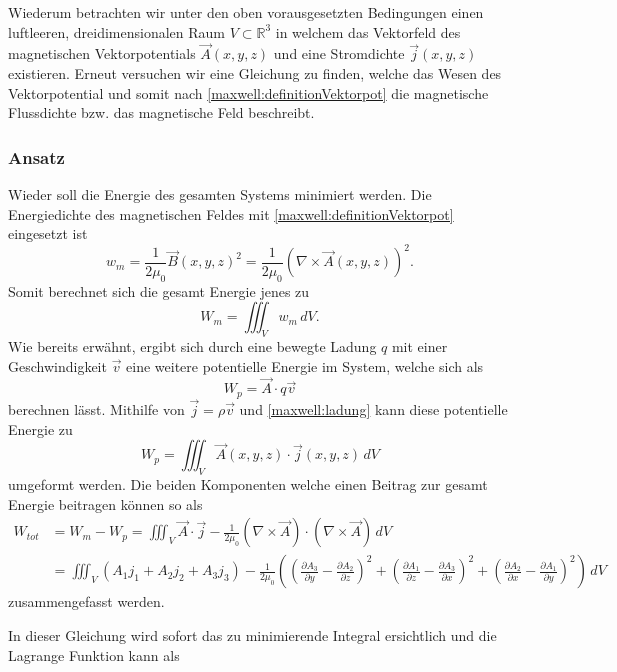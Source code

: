 Wiederum betrachten wir unter den oben vorausgesetzten Bedingungen einen luftleeren, dreidimensionalen Raum $V \subset \mathbb{R}^3$ in welchem das Vektorfeld des magnetischen Vektorpotentials $\vec{A}(x,y,z)$ und eine Stromdichte $\vec{j}(x,y,z)$ existieren. Erneut versuchen wir eine Gleichung zu finden, welche das Wesen des Vektorpotential und somit nach \ref{maxwell:definitionVektorpot} die magnetische Flussdichte bzw. das magnetische Feld beschreibt. 

\subsubsection{Ansatz}

Wieder soll die Energie des gesamten Systems minimiert werden. 
Die Energiedichte des magnetischen Feldes mit \ref{maxwell:definitionVektorpot} eingesetzt ist
\[ w_m 
= 
\frac{1}{2\mu_0}\vec{B}(x,y,z)^2
=
\frac{1}{2\mu_0}\left(\nabla\times\vec{A}(x,y,z)\right)^2. \]
Somit berechnet sich die gesamt Energie jenes zu 
\begin{equation}
	W_m = \iiint_V w_m\, dV.
\end{equation}
Wie bereits erwähnt, ergibt sich durch eine bewegte Ladung $q$ mit einer Geschwindigkeit $\vec{v}$ eine weitere potentielle Energie im System, welche sich als 
\[ 
W_{p}
= 
\vec{A}
\cdot
q\vec{v}
 \]
berechnen lässt.
Mithilfe von $\vec{j} = \rho\vec{v}$ und \ref{maxwell:ladung} kann diese potentielle Energie zu 
\begin{equation}
	W_p
	= 
	\iiint_V \vec{A}(x,y,z)\cdot\vec{j}(x,y,z)\,dV
\end{equation}
umgeformt werden.
Die beiden Komponenten welche einen Beitrag zur gesamt Energie beitragen können so als 
\begin{align*}
W_{tot} 
&=
W_m - W_p
=
\iiint_V \vec{A}\cdot\vec{j}
- \frac{1}{2\mu_0}\left(\nabla\times\vec{A}\right)\cdot\left(\nabla\times\vec{A}\right)\, dV \\
&=
\iiint_V \left( A_1j_1 + A_2j_2 + A_3j_3\right) - 
 \frac{1}{2\mu_0}\left( 
 	\left( \frac{\partial A_3}{\partial y} -\frac{\partial A_2}{\partial z}\right)^2 
 + \left( \frac{\partial A_1}{\partial z} -\frac{\partial A_3}{\partial x}\right)^2
 + \left(\frac{\partial A_2}{\partial x} -\frac{\partial A_1}{\partial y} \right)^2   
 \right) \,dV
\end{align*}
zusammengefasst werden. 

In dieser Gleichung wird sofort das zu minimierende Integral ersichtlich und die Lagrange Funktion kann als 

